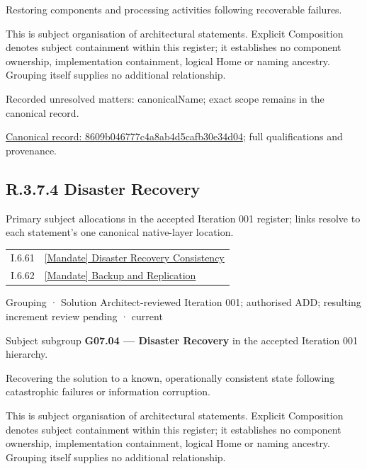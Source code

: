 Restoring components and processing activities following recoverable failures.



This is subject organisation of architectural statements. Explicit Composition denotes subject containment within this register; it establishes no component ownership, implementation containment, logical Home or naming ancestry. Grouping itself supplies no additional relationship.


{\small Recorded unresolved matters: canonicalName; exact scope remains in the canonical record.}\par
{\footnotesize \href{../../../../continuum/grouping/8609b046777c4a8ab4d5cafb30e34d04.md}{Canonical record: 8609b046777c4a8ab4d5cafb30e34d04}; full qualifications and provenance.}\par
\subsection*{R.3.7.4 Disaster Recovery}
\label{navigation:R.3.7.4}

Primary subject allocations in the accepted Iteration 001 register; links resolve to each statement’s one canonical native-layer location.\par
\begin{longtable}{p{.22\linewidth}p{.73\linewidth}}
I.6.61 & \hyperref[element:81fdb5611a0f4338ae85478781032dd7]{[Mandate] Disaster Recovery Consistency} \\
I.6.62 & \hyperref[element:8731f88e202a4f5dacb408e5a1d474a8]{[Mandate] Backup and Replication} \\
\end{longtable}
\label{element:49966f8f01e244b4926ce4dc4c41fb47}
{\small Grouping · Solution Architect-reviewed Iteration 001; authorised ADD; resulting increment review pending · current}\par

Subject subgroup \textbf{G07.04 — Disaster Recovery} in the accepted Iteration 001 hierarchy.



Recovering the solution to a known, operationally consistent state following catastrophic failures or information corruption.



This is subject organisation of architectural statements. Explicit Composition denotes subject containment within this register; it establishes no component ownership, implementation containment, logical Home or naming ancestry. Grouping itself supplies no additional relationship.


